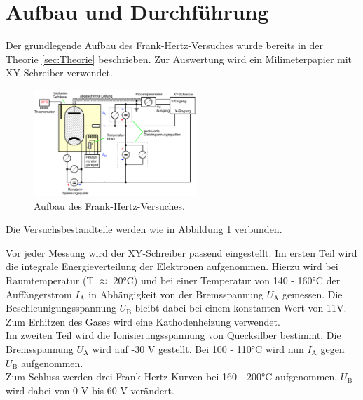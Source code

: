 \section{Aufbau und Durchführung}

Der grundlegende Aufbau des Frank-Hertz-Versuches wurde bereits in der Theorie \ref{sec:Theorie} beschrieben.
Zur Auswertung wird ein Milimeterpapier mit XY-Schreiber verwendet. 
\begin{figure}[H]
    \centering
    \includegraphics[height=4cm]{Aufbau/Aufbau.pdf}
    \caption{Aufbau des Frank-Hertz-Versuches.}
    \label{fig:Aufbau}
\end{figure}
Die Versuchsbestandteile werden wie in Abbildung \ref{fig:Aufbau} verbunden. 

Vor jeder Messung wird der XY-Schreiber passend eingestellt.
Im ersten Teil wird die integrale Energieverteilung der Elektronen aufgenommen. Hierzu wird bei Raumtemperatur (T $\approx$ 20°C) und bei einer Temperatur von 140 - 160°C der Auffängerstrom $I_\text{A}$ in Abhängigkeit von der Bremsspannung $U_\text{A}$ gemessen. Die Beschleunigungsspannung $U_\text{B}$ bleibt dabei bei einem konstanten Wert von 11V. Zum Erhitzen des Gases wird eine Kathodenheizung verwendet.\\
Im zweiten Teil wird die Ionisierungsspannung von Quecksilber bestimmt. Die Bremsspannung $U_\text{A}$ wird auf -30 V gestellt. Bei 100 - 110°C wird nun $I_\text{A}$ gegen $U_\text{B}$ aufgenommen.  \\
Zum Schluss werden drei Frank-Hertz-Kurven bei 160 - 200°C aufgenommen. $U_\text{B}$ wird dabei von 0 V bis 60 V verändert. 